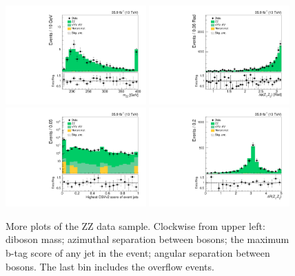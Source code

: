 \clearpage
\begin{figure}[!h]
\centering
\includegraphics[width=0.48\textwidth]{figures/dibosons/zz4l/mZZ.pdf}
\includegraphics[width=0.48\textwidth]{figures/dibosons/zz4l/dphiZZ.pdf}
\includegraphics[width=0.48\textwidth]{figures/dibosons/zz4l/bDiscrMax.pdf}
\includegraphics[width=0.48\textwidth]{figures/dibosons/zz4l/dRZ1Z2.pdf}
\caption{More plots of the ZZ data sample.
Clockwise from upper left: diboson mass; azimuthal separation between bosons; the maximum b-tag score of any jet in the event; angular separation between bosons.
The last bin includes the overflow events.
\label{fig:zz4l_moreplots}}
\end{figure}

